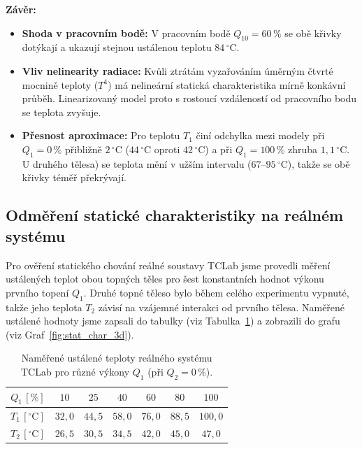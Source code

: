 \documentclass[12pt]{article} %
\begin{document}
\textbf{Závěr:}
\begin{itemize}
    \item \textbf{Shoda v pracovním bodě:} V pracovním bodě $Q_{10} = 60\,\%$ se obě křivky dotýkají a ukazují stejnou ustálenou teplotu $84\,^\circ\mathrm{C}$.
    \item \textbf{Vliv nelinearity radiace:} Kvůli ztrátám vyzařováním úměrným čtvrté mocnině teploty ($T^4$) má nelineární statická charakteristika mírně konkávní průběh. Linearizovaný model proto s rostoucí vzdáleností od pracovního bodu se teplota zvyšuje.
    \item \textbf{Přesnost aproximace:} Pro teplotu $T_1$ činí odchylka mezi modely při $Q_1 = 0\,\%$ přibližně $2\,^\circ\mathrm{C}$ ($44\,^\circ\mathrm{C}$ oproti $42\,^\circ\mathrm{C}$) a při $Q_1 = 100\,\%$ zhruba $1{,}1\,^\circ\mathrm{C}$. U druhého tělesa) se teplota mění v užším intervalu ($67\text{--}95\,^\circ\mathrm{C}$), takže se obě křivky téměř překrývají.
\end{itemize}

\subsection{Odměření statické charakteristiky na reálném systému}

Pro ověření statického chování reálné soustavy TCLab jsme provedli měření ustálených teplot obou topných těles pro šest konstantních hodnot výkonu prvního topení $Q_1$. Druhé topné těleso bylo během celého experimentu vypnuté, takže jeho teplota $T_2$ závisí na vzájemné interakci od prvního tělesa. Naměřené ustálené hodnoty jsme zapsali do tabulky (viz Tabulka~\ref{tab:stat_char_3d}) a zobrazili do grafu (viz Graf~\ref{fig:stat_char_3d}).

\begin{table}[htbp]
    \centering
    \caption{Naměřené ustálené teploty reálného systému TCLab pro různé výkony $Q_1$ (při $Q_2 = 0\,\%$).}
    \label{tab:stat_char_3d}
    \begin{tabular}{|c|c|c|c|c|c|c|}
        \hline
        $Q_1\,[\mathrm{\%}]$ & $10$ & $25$ & $40$ & $60$ & $80$ & $100$ \\
        \hline
        $T_1\,[^\circ\mathrm{C}]$ & $32{,}0$ & $44{,}5$ & $58{,}0$ & $76{,}0$ & $88{,}5$ & $100{,}0$ \\
        $T_2\,[^\circ\mathrm{C}]$ & $26{,}5$ & $30{,}5$ & $34{,}5$ & $42{,}0$ & $45{,}0$ & $47{,}0$ \\
        \hline
    \end{tabular}
\end{table}
\end{document}
